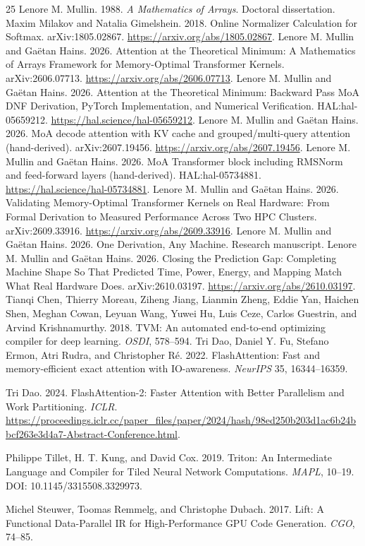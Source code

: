 \begin{thebibliography}{25}
 Lenore M. Mullin. 1988. \emph{A Mathematics of Arrays}. Doctoral dissertation.
 Maxim Milakov and Natalia Gimelshein. 2018. Online Normalizer Calculation for Softmax. arXiv:1805.02867. \url{https://arxiv.org/abs/1805.02867}.
 Lenore M. Mullin and Gaëtan Hains. 2026. Attention at the Theoretical Minimum: A Mathematics of Arrays Framework for Memory-Optimal Transformer Kernels. arXiv:2606.07713. \url{https://arxiv.org/abs/2606.07713}.
 Lenore M. Mullin and Gaëtan Hains. 2026. Attention at the Theoretical Minimum: Backward Pass MoA DNF Derivation, PyTorch Implementation, and Numerical Verification. HAL:hal-05659212. \url{https://hal.science/hal-05659212}.
 Lenore M. Mullin and Gaëtan Hains. 2026. MoA decode attention with KV cache and grouped/multi-query attention (hand-derived). arXiv:2607.19456. \url{https://arxiv.org/abs/2607.19456}.
 Lenore M. Mullin and Gaëtan Hains. 2026. MoA Transformer block including RMSNorm and feed-forward layers (hand-derived). HAL:hal-05734881. \url{https://hal.science/hal-05734881}.
 Lenore M. Mullin and Gaëtan Hains. 2026. Validating Memory-Optimal Transformer Kernels on Real Hardware: From Formal Derivation to Measured Performance Across Two HPC Clusters. arXiv:2609.33916. \url{https://arxiv.org/abs/2609.33916}.
 Lenore M. Mullin and Gaëtan Hains. 2026. One Derivation, Any Machine. Research manuscript.
 Lenore M. Mullin and Gaëtan Hains. 2026. Closing the Prediction Gap: Completing Machine Shape So That Predicted Time, Power, Energy, and Mapping Match What Real Hardware Does. arXiv:2610.03197. \url{https://arxiv.org/abs/2610.03197}.
 Tianqi Chen, Thierry Moreau, Ziheng Jiang, Lianmin Zheng, Eddie Yan, Haichen Shen, Meghan Cowan, Leyuan Wang, Yuwei Hu, Luis Ceze, Carlos Guestrin, and Arvind Krishnamurthy. 2018. TVM: An automated end-to-end optimizing compiler for deep learning. \emph{OSDI}, 578--594.
 Tri Dao, Daniel Y. Fu, Stefano Ermon, Atri Rudra, and Christopher R\'e. 2022. FlashAttention: Fast and memory-efficient exact attention with IO-awareness. \emph{NeurIPS} 35, 16344--16359.

 Tri Dao. 2024. FlashAttention-2: Faster Attention with Better Parallelism and Work Partitioning. \emph{ICLR}. \url{https://proceedings.iclr.cc/paper_files/paper/2024/hash/98ed250b203d1ac6b24bbcf263e3d4a7-Abstract-Conference.html}.

 Philippe Tillet, H. T. Kung, and David Cox. 2019. Triton: An Intermediate Language and Compiler for Tiled Neural Network Computations. \emph{MAPL}, 10--19. DOI: 10.1145/3315508.3329973.

 Michel Steuwer, Toomas Remmelg, and Christophe Dubach. 2017. Lift: A Functional Data-Parallel IR for High-Performance GPU Code Generation. \emph{CGO}, 74--85.
\end{thebibliography}
